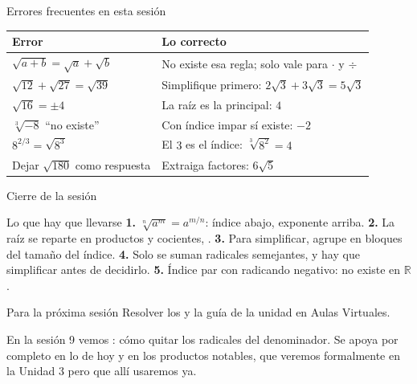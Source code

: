 \documentclass[aspectratio=169,10pt]{beamer}
\begin{document}
\begin{frame}{Errores frecuentes en esta sesión}
  \scriptsize
  \begin{center}
  \begin{tabular}{@{}p{5.0cm}p{7.0cm}@{}}
    \toprule
    \textbf{Error} & \textbf{Lo correcto} \\
    \midrule
    $\sqrt{a+b}=\sqrt{a}+\sqrt{b}$ &
      No existe esa regla; solo vale para $\cdot$ y $\div$ \\
    \addlinespace
    $\sqrt{12}+\sqrt{27}=\sqrt{39}$ &
      Simplifique primero: $2\sqrt3+3\sqrt3=5\sqrt3$ \\
    \addlinespace
    $\sqrt{16}=\pm 4$ &
      La raíz es la principal: $4$ \\
    \addlinespace
    $\sqrt[3]{-8}$ ``no existe'' &
      Con índice impar sí existe: $-2$ \\
    \addlinespace
    $8^{2/3}=\sqrt{8^{3}}$ &
      El $3$ es el índice: $\sqrt[3]{8^{2}}=4$ \\
    \addlinespace
    Dejar $\sqrt{180}$ como respuesta &
      Extraiga factores: $6\sqrt{5}$ \\
    \bottomrule
  \end{tabular}
  \end{center}
\end{frame}

\begin{frame}{Cierre de la sesión}
  \scriptsize
  \begin{block}{Lo que hay que llevarse}
    \tiny
    \textbf{1.} $\sqrt[n]{a^{m}} = a^{m/n}$: índice abajo, exponente
    arriba. \quad
    \textbf{2.} La raíz se reparte en productos y cocientes,
    . \quad
    \textbf{3.} Para simplificar, agrupe en bloques del tamaño del índice.
    \quad
    \textbf{4.} Solo se suman radicales semejantes, y hay que simplificar
    antes de decidirlo. \quad
    \textbf{5.} Índice par con radicando negativo: no existe en
    $\mathbb{R}$.
  \end{block}

  \vspace{0.1cm}
  \begin{alertblock}{Para la próxima sesión}
    \tiny
    Resolver los  y la guía de la unidad en
    Aulas Virtuales.

    \vspace{0.05cm}
    En la sesión 9 vemos : cómo quitar los radicales del
    denominador. Se apoya por completo en lo de hoy y en los productos
    notables, que veremos formalmente en la Unidad 3 pero que allí usaremos
    ya.
  \end{alertblock}
\end{frame}
\end{document}
